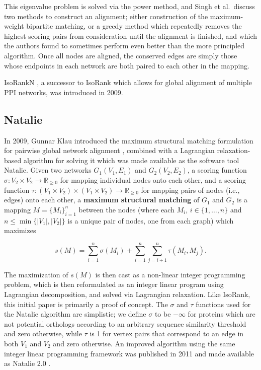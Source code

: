 \documentclass[12pt]{thesis}
\theoremstyle{plain}
\theoremstyle{definition}
\theoremstyle{remark}
\newcommand{\R}{\mathbb{R}}
\begin{document}
This eigenvalue problem is solved via the power method, and Singh et al.\ discuss two methods to construct an alignment; either construction of the maximum-weight bipartite matching, or a greedy method which repeatedly removes the highest-scoring pairs from consideration until the alignment is finished, and which the authors found to sometimes perform even better than the more principled algorithm. Once all nodes are aligned, the conserved edges are simply those whose endpoints in each network are both paired to each other in the mapping.

IsoRankN \cite{liao2009isorankn}, a successor to IsoRank which allows for global alignment of multiple PPI networks, was introduced in 2009.

\subsection{Natalie}

In 2009, Gunnar Klau introduced the maximum structural matching formulation for pairwise global network alignment \cite{Klau_2009}, combined with a Lagrangian relaxation-based algorithm for solving it which was made available as the software tool Natalie. Given two networks $G_1(V_1,E_1)$ and $G_2(V_2,E_2)$, a scoring function $\sigma:V_2\times V_2\rightarrow \R_{\geq 0}$ for mapping individual nodes onto each other, and a scoring function $\tau:(V_1\times V_2)\times (V_1\times V_2)\rightarrow\R_{\geq 0}$ for mapping pairs of nodes (i.e., edges) onto each other, a \textbf{maximum structural matching} of $G_1$ and $G_2$ is a mapping $M=\{M_i\}_{i=1}^n$ between the nodes (where each $M_i$, $i\in \{1,\dots,n\}$ and $n\leq \min\{|V_1|,|V_2|\}$ is a unique pair of nodes, one from each graph) which maximizes

\[s(M) = \sum_{i=1}^n \sigma(M_i) + \sum_{i=1}^n \sum_{j=i+1}^n \tau(M_i,M_j). \]

The maximization of $s(M)$ is then cast as a non-linear integer programming problem, which is then reformulated as an integer linear program using Lagrangian decomposition, and solved via Lagrangian relaxation. Like IsoRank, this initial paper is primarily a proof of concept. The $\sigma$ and $\tau$ functions used for the  Natalie algorithm are simplistic; we define $\sigma$ to be $-\infty$ for proteins which are not potential orthologs according to an arbitrary sequence similarity threshold and zero otherwise, while $\tau$ is 1 for vertex pairs that correspond to an edge in both $V_1$ and $V_2$ and zero otherwise. An improved algorithm using the same integer linear programming framework was published in 2011 and made available as Natalie 2.0 \cite{el2011lagrangian}.
\end{document}

